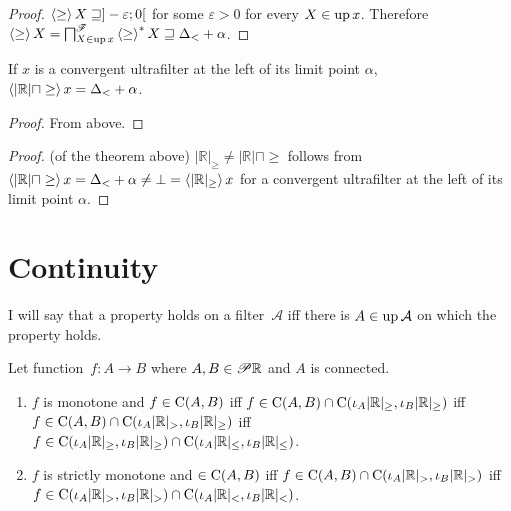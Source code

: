 \begin{proof}
  $\left\langle \geq\right\rangle X \sqsupseteq] - \varepsilon ; 0 [$ for some
  $\varepsilon > 0$ for every $X \in \operatorname{up} x$. Therefore $\left\langle  \geq
  \right\rangle X = \bigsqcap^{\mathscr{F}}_{X \in \operatorname{up} x} \left\langle  \geq
  \right\rangle ^{\ast} X \sqsupseteq \Delta_{<} + \alpha$.
\end{proof}

\begin{lem}
  If $x$ is a convergent ultrafilter at the left of its
  limit point $\alpha$, $\left\langle  | \mathbb{R} | \sqcap \geq \right\rangle x =
  \Delta_{<} + \alpha$.
\end{lem}

\begin{proof}
From above.
\end{proof}

\begin{proof}
  (of the theorem above) $| \mathbb{R} |_{\geq} \neq | \mathbb{R} | \sqcap
  \geq$ follows from $\left\langle  | \mathbb{R} | \sqcap \geq \right\rangle x =
  \Delta_{<} + \alpha \neq \bot = \left\langle  | \mathbb{R} |_{\geq} \right\rangle x$
  for a convergent ultrafilter at the left of its limit point $\alpha$.
\end{proof}

\section{Continuity}

I will say that a property holds on a filter~$\mathcal{A}$ iff there is $A\in\operatorname{up}\mathcal{A}$ on which the property holds.


\begin{lem}
Let function~$f:A\rightarrow B$ where $A,B\in\mathscr{P}\mathbb{R}$ and $A$ is connected.
\begin{enumerate}
\item $f$ is monotone and $f\in\mathrm{C}(A,B)$ iff
$f\in\mathrm{C}(A,B)\cap\mathrm{C}(\iota_A|\mathbb{R}|_{\geq},\iota_B|\mathbb{R}|_{\geq})$ iff
$f\in\mathrm{C}(A,B)\cap\mathrm{C}(\iota_A|\mathbb{R}|_{>},\iota_B|\mathbb{R}|_{\geq})$ iff
$f\in\mathrm{C}(\iota_A|\mathbb{R}|_{\geq},\iota_B|\mathbb{R}|_{\geq})\cap
\mathrm{C}(\iota_A|\mathbb{R}|_{\leq},\iota_B|\mathbb{R}|_{\leq})$.
\item $f$ is strictly monotone and $\in\mathrm{C}(A,B)$ iff
$f\in\mathrm{C}(A,B)\cap\mathrm{C}(\iota_A|\mathbb{R}|_{>},\iota_B|\mathbb{R}|_{>})$ iff
$f\in\mathrm{C}(\iota_A|\mathbb{R}|_{>},\iota_B|\mathbb{R}|_{>})\cap
\mathrm{C}(\iota_A|\mathbb{R}|_{<},\iota_B|\mathbb{R}|_{<})$.
\end{enumerate}
\end{lem}

